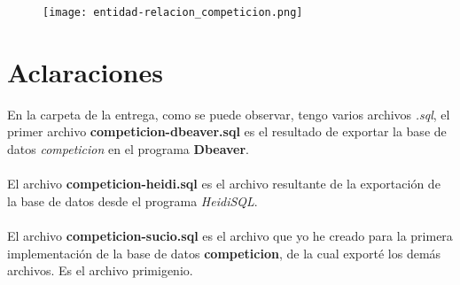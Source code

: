 \documentclass{article}
\begin{document}
    \begin{figure}[h]
      \centering
      \texttt{[image: entidad-relacion\_competicion.png]}
    \end{figure}

\newpage
  \section{Aclaraciones}
    En la carpeta de la entrega, como se puede observar, tengo varios archivos \textit{.sql}, el primer archivo \textbf{competicion-dbeaver.sql} es el resultado de exportar la base de datos
    \textit{competicion} en el programa \textbf{Dbeaver}.
    \\\\
    El archivo \textbf{competicion-heidi.sql} es el archivo resultante de la exportación de la base de datos desde el programa \textit{HeidiSQL}.
    \\\\
    El archivo \textbf{competicion-sucio.sql} es el archivo que yo he creado para la primera implementación de la base de datos \textbf{competicion}, de la cual exporté los demás archivos. Es el archivo primigenio.
\end{document}
